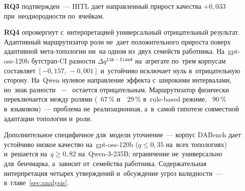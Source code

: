 \textbf{RQ3} подтвержден~--- HITL дает направленный прирост качества
$+0{,}033$ при~неоднородности по~ячейкам.

\textbf{RQ4} опровергнут с~интерпретацией универсальный отрицательный результат.
Адаптивный маршрутизатор роли не~дает положительного прироста поверх
адаптивной мета-топологии ни~на одном из~двух семейств работника.
На~gpt-oss-120b бутстрап-CI разности $\Delta q^{\mathtt{llm}-\mathtt{fixed}}$
на~агрегате по~трем корпусам составляет $[-0{,}157,\,-0{,}001]$ и~устойчиво
исключает нуль в~отрицательную сторону. На~Qwen нулевое направление эффекта
с~широкими интервалами, но~знак разности ~$-$~
остается отрицательным. Маршрутизатор физически переключается между ролями
(~67\,\% и~~29\,\% в~rule-based режиме,
~90\,\% в~языковом)~--- проблема не~реализационная,
а~в~самой гипотезе совместной адаптации топологии и~роли.

Дополнительное специфичное для~модели уточнение~--- корпус DABench дает
устойчиво низкое качество на~gpt-oss-120b ($q\le0{,}35$ на~всех
топологиях) и~решается на~$q\ge0{,}82$ на~Qwen-3-235B; ограничение
не~универсально для~бенчмарка, а~зависит от~семейства работника.
Содержательная интерпретация четырех утверждений и~обсуждение угроз
валидности~--- в~главе~\ref{sec:analysis}.
